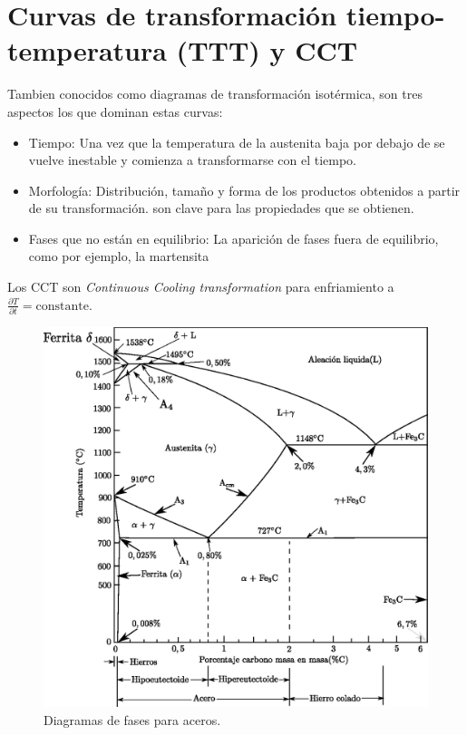 \part{Curvas de transformación tiempo-temperatura (TTT) y CCT}
Tambien conocidos como diagramas de transformación isotérmica, son tres aspectos los que dominan estas curvas:
\begin{itemize}
    \item Tiempo: Una vez que la temperatura de la austenita baja por debajo de \Aone se vuelve inestable y comienza a transformarse con el tiempo. 
    \item Morfología: Distribución, tamaño y forma de los productos obtenidos a partir de su transformación. son clave para las propiedades que se obtienen.
    \item Fases que no están en equilibrio: La aparición de fases fuera de equilibrio, como por ejemplo, la martensita
\end{itemize}
Los CCT son \textit{Continuous Cooling transformation} para enfriamiento a $\frac{\partial T}{\partial t}= \text{constante}$.


\begin{figure}[ht]
    \centering
    \includegraphics[width=1\textwidth]{fig/diagAceroreal.eps}
    \caption{Diagramas de fases para aceros.}
    \label{fig:diagAceros}
\end{figure}

